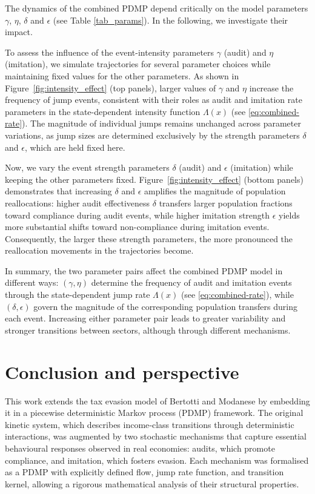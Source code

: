 \documentclass[11pt]{article}
\theoremstyle{plain}
\theoremstyle{definition}
\newcommand{\1}{\mathbf{1}}
\begin{document}
The dynamics of the combined PDMP depend critically on the model parameters $\gamma$, $\eta$, $\delta$ and $\epsilon$ (see Table \ref{tab_params}). In the following, we investigate their impact.

To assess the influence of the event-intensity parameters $\gamma$ (audit) and $\eta$ (imitation), we simulate trajectories for several parameter choices while maintaining fixed values for the other parameters. As shown in Figure~\ref{fig:intensity_effect} (top panels), larger values of $\gamma$ and $\eta$ increase 
the frequency of jump events, consistent with their roles as audit and imitation rate parameters in the 
state-dependent intensity function $\Lambda(x)$ (see \eqref{eq:combined-rate}). The magnitude of individual jumps remains unchanged 
across parameter variations, as jump sizes are determined exclusively by the strength parameters $\delta$ and $\epsilon$, which are held fixed here. 

Now, we vary the event strength parameters $\delta$ (audit) and $\epsilon$ (imitation) while keeping the other parameters fixed.
Figure~\ref{fig:intensity_effect} (bottom panels) demonstrates that increasing $\delta$ and $\epsilon$ amplifies 
the magnitude of population reallocations: higher audit effectiveness $\delta$ transfers larger 
population fractions toward compliance during audit events, while higher imitation strength $\epsilon$ 
yields more substantial shifts toward non-compliance during imitation events. Consequently, the larger these strength parameters, the more pronounced the reallocation movements in the trajectories become.

In summary, the two parameter pairs affect the combined PDMP model in different ways: $(\gamma,\eta)$ determine the frequency of audit and imitation events through the state-dependent jump rate 
$\Lambda(x)$ (see \eqref{eq:combined-rate}), while $(\delta,\epsilon)$ govern the magnitude of the corresponding population transfers 
during each event. Increasing either parameter pair leads to greater variability and 
stronger transitions between sectors, although through different mechanisms.

\section{Conclusion and perspective}
\label{conclusion}

This work extends the tax evasion model of Bertotti and Modanese \cite{bertotti2018mathematical} by embedding it in a piecewise deterministic Markov process (PDMP) framework. The original kinetic system, which describes income‐class transitions through deterministic interactions, was augmented by two stochastic mechanisms that capture essential behavioural responses observed in real economies: audits, which promote compliance, and imitation, which fosters evasion. Each mechanism was formalised as a PDMP with explicitly defined flow, jump rate function, and transition kernel, allowing a rigorous mathematical analysis of their structural properties.
\end{document}
